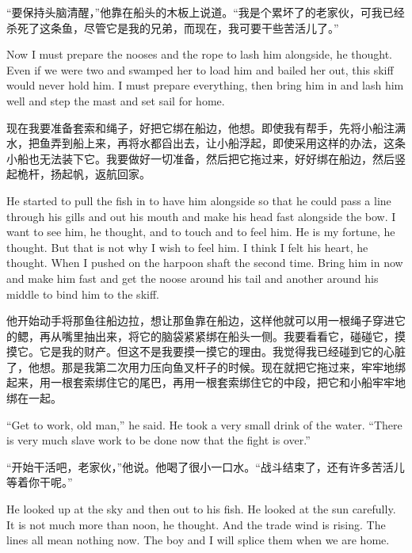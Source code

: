 \begin{paracol}{2}
\switchcolumn

“要保持头脑清醒，”他靠在船头的木板上说道。“我是个累坏了的老家伙，可我已经杀死了这条鱼，尽管它是我的兄弟，而现在，我可要干些苦活儿了。”

\switchcolumn*

Now I must prepare the \glspl{noose} and the rope to lash him alongside, he
thought. Even if we were two and \gls{swamped} her to load him and \gls{bailed}
her out, this skiff would never hold him. I must prepare everything, then
bring him in and lash him well and step the mast and set sail for home.

\switchcolumn

现在我要准备套索和绳子，好把它绑在船边，他想。即使我有帮手，先将小船注满水，把鱼弄到船上来，再将水都舀出去，让小船浮起，即使采用这样的办法，这条小船也无法装下它。我要做好一切准备，然后把它拖过来，好好绑在船边，然后竖起桅杆，扬起帆，返航回家。

\switchcolumn*

He started to pull the fish in to have him alongside so that he could pass a
line through his gills and out his mouth and make his head fast alongside
the bow. I want to see him, he thought, and to touch and to feel him. He is
my \gls{fortune}, he thought. But that is not why I wish to feel him. I think I
felt his heart, he thought. When I pushed on the harpoon shaft the second
time. Bring him in now and make him fast and get the noose around his tail
and another around his middle to bind him to the skiff.

\switchcolumn

他开始动手将那鱼往船边拉，想让那鱼靠在船边，这样他就可以用一根绳子穿进它的鳃，再从嘴里抽出来，将它的脑袋紧紧绑在船头一侧。我要看看它，碰碰它，摸摸它。它是我的财产。但这不是我要摸一摸它的理由。我觉得我已经碰到它的心脏了，他想。那是我第二次用力压向鱼叉杆子的时候。现在就把它拖过来，牢牢地绑起来，用一根套索绑住它的尾巴，再用一根套索绑住它的中段，把它和小船牢牢地绑在一起。

\switchcolumn*

``Get to work, old man,'' he said. He took a very small drink of the water.
``There is very much slave work to be done now that the fight is over.''

\switchcolumn

“开始干活吧，老家伙，”他说。他喝了很小一口水。“战斗结束了，还有许多苦活儿等着你干呢。”

\switchcolumn*

He looked up at the sky and then out to his fish. He looked at the sun
carefully. It is not much more than noon, he thought. And the trade wind is
rising. The lines all mean nothing now. The boy and I will \gls{splice} them
when we are home.


\end{paracol}
